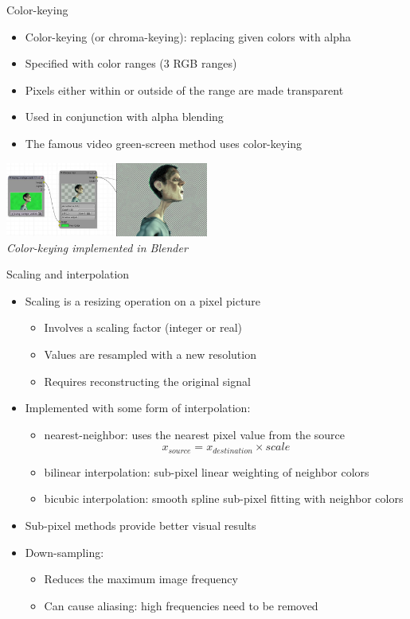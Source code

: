 \begin{frame}{Color-keying}
  \begin{itemize}
  \item Color-keying (or chroma-keying): replacing given colors with alpha
  \item Specified with color ranges (3 RGB ranges)
  \item Pixels either within or outside of the range are made transparent
  \item Used in conjunction with alpha blending
  \item The famous video green-screen method uses color-keying
  \end{itemize}
  \begin{center}
  \includegraphics[width=0.5\textwidth]{slides/graphics-theory/chroma-key-blender.jpg}\\
  \textit{\small Color-keying implemented in Blender}
  \end{center}
\end{frame}

\begin{frame}{Scaling and interpolation}
  \begin{itemize}
  \item Scaling is a resizing operation on a pixel picture
    \begin{itemize}
    \item Involves a scaling factor (integer or real)
    \item Values are resampled with a new resolution
    \item Requires reconstructing the original signal
    \end{itemize}
  \item Implemented with some form of interpolation:
    \begin{itemize}
    \item nearest-neighbor: uses the nearest pixel value from the source
\[
x_{source} = x_{destination} \times scale
\]
  \item bilinear interpolation: sub-pixel linear weighting of neighbor colors
  \item bicubic interpolation: smooth spline sub-pixel fitting with neighbor colors
    \end{itemize}
  \item Sub-pixel methods provide better visual results
  \item Down-sampling:
    \begin{itemize}
    \item Reduces the maximum image frequency
    \item Can cause aliasing: high frequencies need to be removed
    \end{itemize}
  \end{itemize}
\end{frame}


